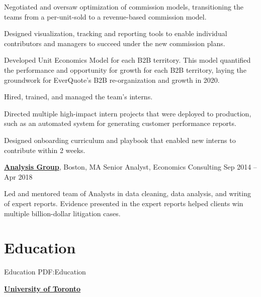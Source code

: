 \documentclass[letterpaper,10pt,oneside]{article}
\begin{document}
\begin{body}
\begin{flushleft}
\vspace{0.5em} \SubBulletItem 	Negotiated and oversaw optimization of commission models, transitioning the teams from a per-unit-sold to a revenue-based commission model. 

\vspace{0.5em} \SubBulletItem 	Designed visualization, tracking and reporting tools to enable individual contributors and managers to succeed under the new commission plans. 

\vspace{0.5em} \SubBulletItem 	Developed Unit Economics Model for each B2B territory. This model quantified the performance and opportunity for growth for each B2B territory, laying the groundwork for EverQuote's B2B re-organization and growth in 2020.

\vspace{0.75em}
\BulletItem Hired, trained, and managed the team's interns. 

\vspace{0.5em} \SubBulletItem Directed multiple high-impact intern projects that were deployed to production, such as an automated system for generating customer performance reports.

\vspace{0.5em} \SubBulletItem Designed onboarding curriculum and playbook that enabled new interns to contribute within 2 weeks. 

\end{flushleft}

\vspace{0.75em}
\href{http://www.analysisgroup.com/}
{\textbf{Analysis Group}},
Boston, MA
\GapNoBreak
Senior Analyst,
Economics Consulting
\hfill
Sep 2014 --
Apr 2018
\begin{flushleft}

\BulletItem Led and mentored team of Analysts in data cleaning, data analysis, and writing of expert reports. Evidence presented in the expert reports helped clients win multiple billion-dollar litigation cases.

\end{flushleft}


\section
{Education}
{Education}
{PDF:Education}

\href{https://www.utoronto.ca/}
{\textbf{University of Toronto}}


\end{body}
\end{document}

